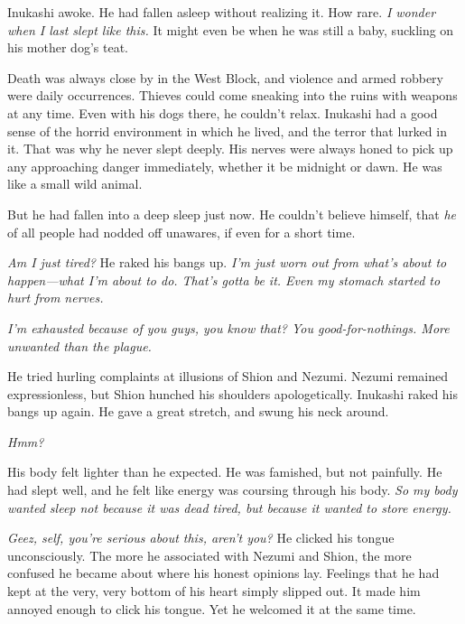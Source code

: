\clearpage


Inukashi awoke. He had fallen asleep without realizing it. How rare. \emph{I
wonder when I last slept like this.} It might even be when he was still a
baby, suckling on his mother dog's teat.

Death was always close by in the West Block, and violence and armed
robbery were daily occurrences. Thieves could come sneaking into the
ruins with weapons at any time. Even with his dogs there, he couldn't
relax. Inukashi had a good sense of the horrid environment in which he
lived, and the terror that lurked in it. That was why he never slept
deeply. His nerves were always honed to pick up any approaching danger
immediately, whether it be midnight or dawn. He was like a small wild
animal.

But he had fallen into a deep sleep just now. He couldn't believe
himself, that \emph{he} of all people had nodded off unawares, if even for a
short time.

\emph{Am I just tired?} He raked his bangs up. \emph{I'm just worn out from what's
about to happen---what I'm about to do. That's gotta be it. Even my
stomach started to hurt from nerves.}

\emph{I'm exhausted because of you guys, you know that? You good-for-nothings.
More unwanted than the plague.}

He tried hurling complaints at illusions of Shion and Nezumi. Nezumi
remained expressionless, but Shion hunched his shoulders apologetically.
Inukashi raked his bangs up again. He gave a great stretch, and swung
his neck around.

\emph{Hmm?}

His body felt lighter than he expected. He was famished, but not
painfully. He had slept well, and he felt like energy was coursing
through his body. \emph{So my body wanted sleep not because it was dead tired,
but because it wanted to store energy.}

\emph{Geez, self, you're serious about this, aren't you?} He clicked his tongue
unconsciously. The more he associated with Nezumi and Shion, the more
confused he became about where his honest opinions lay. Feelings that he
had kept at the very, very bottom of his heart simply slipped out. It
made him annoyed enough to click his tongue. Yet he welcomed it at the
same time.

